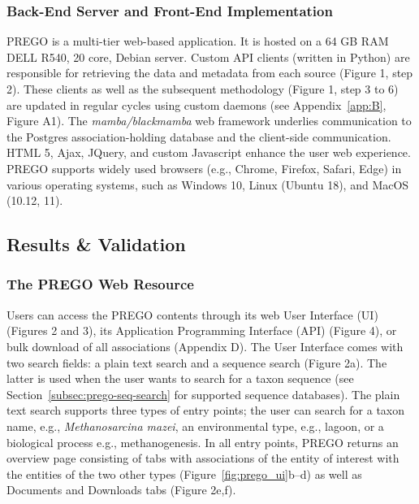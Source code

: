    \subsubsection*{Back-End Server and Front-End Implementation}
   \label{subsec:prego-back-end}

   PREGO is a multi-tier web-based application. 
   It is hosted on a 64 GB RAM DELL R540, 20 core, Debian server. 
   Custom API clients (written in Python) are responsible for retrieving the data and metadata from each source (Figure 1, step 2). 
   These clients as well as the subsequent methodology (Figure 1, step 3 to 6) are updated in regular cycles using custom daemons (see Appendix~\ref{app:B}, Figure A1). 
   The \textit{mamba/blackmamba} web framework underlies communication to the Postgres association-holding database and the client-side communication. 
   HTML 5, Ajax, JQuery, and custom Javascript enhance the user web experience. 
   PREGO supports widely used browsers (e.g., Chrome, Firefox, Safari, Edge) in various operating systems, such as Windows 10, Linux (Ubuntu 18), and MacOS (10.12, 11).


\subsection{Results \& Validation}
\label{sec:prego-results}

   \subsubsection*{The PREGO Web Resource}
   \label{subsec:prego-web-resource}

   Users can access the PREGO contents through its web User Interface (UI) (Figures 2 and 3), its Application Programming Interface (API) (Figure 4), or bulk download of all associations (Appendix D). 
   The User Interface comes with two search fields: a plain text search and a sequence search (Figure 2a). 
   The latter is used when the user wants to search for a taxon sequence (see Section~\ref{subsec:prego-seq-search} for supported sequence databases). 
   The plain text search supports three types of entry points; the user can search for a taxon name, e.g., \textit{Methanosarcina mazei}, an environmental type, e.g., lagoon, or a biological process e.g., methanogenesis. 
   In all entry points, PREGO returns an overview page consisting of tabs with associations of the entity of interest with the entities of the two other types (Figure~\ref{fig:prego_ui}b–d) as well as Documents and Downloads tabs (Figure 2e,f).


